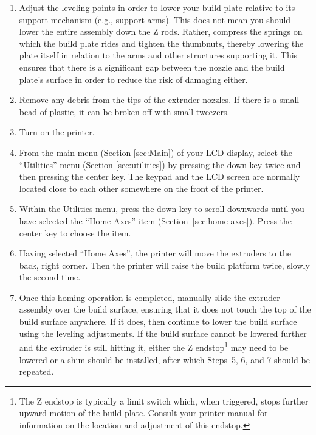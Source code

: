 \begin{enumerate}
\item Adjust the leveling points in order to lower your build plate relative to its support mechanism (e.g., support arms).  This does not mean you should lower the entire assembly down the Z rods.  Rather, compress the springs on which the build plate rides and tighten the thumbnuts, thereby lowering the plate itself in relation to the arms and other structures supporting it.  This ensures that there is a significant gap between the nozzle and the build plate's surface in order to reduce the risk of damaging either.
\item Remove any debris from the tips of the extruder nozzles.  If there is a small bead of plastic, it can be broken off with small tweezers.
\item Turn on the printer.
\item From the main menu (Section \ref{sec:Main}) of your LCD display, select the ``Utilities'' menu (Section \ref{sec:utilities}) by pressing the down key twice and then pressing the center key.  The keypad and the LCD screen are normally located close to each other somewhere on the front of the printer.
\item Within the Utilities menu, press the down key to scroll downwards until you have selected the ``Home Axes'' item (Section~\ref{sec:home-axes}).  Press the center key to choose the item.
\item Having selected ``Home Axes'', the printer will move the extruders to the back, right corner.  Then the printer will raise the build platform twice, slowly the second time.
\item Once this homing operation is completed, manually slide the extruder assembly over the build surface, ensuring that it does not touch the top of the build surface anywhere.  If it does, then continue to lower the build surface using the leveling adjustments.  If the build surface cannot be lowered further and the extruder is still hitting it, either the Z endstop\footnote{The Z endstop is typically a limit switch which, when triggered, stops further upward motion of the build plate.  Consult your printer manual for information on the location and adjustment of this endstop.} may need to be lowered or a shim should be installed, after which Steps~5, 6, and 7 should be repeated.

\end{enumerate}
